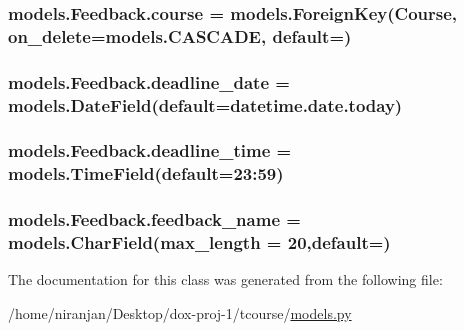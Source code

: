 \subsubsection[{\texorpdfstring{course}{course}}]{\setlength{\rightskip}{0pt plus 5cm}models.\+Feedback.\+course = models.\+Foreign\+Key({\bf Course}, on\+\_\+delete=models.\+C\+A\+S\+C\+A\+DE, default=\textquotesingle{}\textquotesingle{})\hspace{0.3cm}{\ttfamily [static]}}\hypertarget{classmodels_1_1_feedback_a18a97e4e0c860dd1528dc5b515f417f5}{}\label{classmodels_1_1_feedback_a18a97e4e0c860dd1528dc5b515f417f5}
\subsubsection[{\texorpdfstring{deadline\+\_\+date}{deadline_date}}]{\setlength{\rightskip}{0pt plus 5cm}models.\+Feedback.\+deadline\+\_\+date = models.\+Date\+Field(default=datetime.\+date.\+today)\hspace{0.3cm}{\ttfamily [static]}}\hypertarget{classmodels_1_1_feedback_acbdb0048ac21fa284ca76e2c4e7200ec}{}\label{classmodels_1_1_feedback_acbdb0048ac21fa284ca76e2c4e7200ec}
\subsubsection[{\texorpdfstring{deadline\+\_\+time}{deadline_time}}]{\setlength{\rightskip}{0pt plus 5cm}models.\+Feedback.\+deadline\+\_\+time = models.\+Time\+Field(default=\textquotesingle{}23\+:59\textquotesingle{})\hspace{0.3cm}{\ttfamily [static]}}\hypertarget{classmodels_1_1_feedback_ad72519619c1896899425e287a26d8f93}{}\label{classmodels_1_1_feedback_ad72519619c1896899425e287a26d8f93}
\subsubsection[{\texorpdfstring{feedback\+\_\+name}{feedback_name}}]{\setlength{\rightskip}{0pt plus 5cm}models.\+Feedback.\+feedback\+\_\+name = models.\+Char\+Field(max\+\_\+length = 20,default=\textquotesingle{}\textquotesingle{})\hspace{0.3cm}{\ttfamily [static]}}\hypertarget{classmodels_1_1_feedback_a752d4d5603d15c1387803065c603639d}{}\label{classmodels_1_1_feedback_a752d4d5603d15c1387803065c603639d}


The documentation for this class was generated from the following file\+:\begin{DoxyCompactItemize}
\item 
/home/niranjan/\+Desktop/dox-\/proj-\/1/tcourse/\hyperlink{models_8py}{models.\+py}\end{DoxyCompactItemize}
